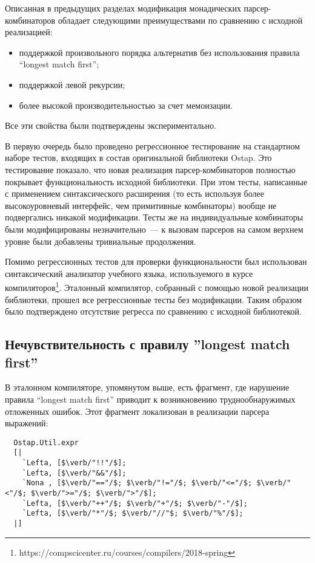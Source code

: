 \documentclass[conference]{IEEEtran}
\begin{document}
Описанная в предыдущих разделах модификация монадических парсер-комбинаторов обладает следующими преимуществами по сравнению с исходной реализацией:

\begin{itemize}
  \item поддержкой произвольного порядка альтернатив без использования правила ``longest match first'';
  \item поддержкой левой рекурсии;
  \item более высокой производительностью за счет мемоизации.
\end{itemize}

Все эти свойства были подтверждены экспериментально.

В первую очередь было проведено регрессионное тестирование на стандартном наборе тестов, входящих в состав оригинальной библиотеки Ostap. Это тестирование показало,
что новая реализация парсер-комбинаторов полностью покрывает функциональность исходной библиотеки. При этом тесты, написанные с применением синтаксического расширения (то есть
используя более высокоуровневый интерфейс, чем примитивные комбинаторы) вообще не подвергались никакой модификации. Тесты же на индивидуальные комбинаторы были модифицированы
незначительно~--- к вызовам парсеров на самом верхнем уровне были добавлены тривиальные продолжения.

Помимо регрессионных тестов для проверки функциональности был использован синтаксический анализатор учебного языка, используемого в курсе
компиляторов\footnote{https://compscicenter.ru/courses/compilers/2018-spring}. Эталонный компилятор, собранный с помощью новой реализации библиотеки, прошел все
регрессионные тесты без модификации. Таким образом было подтверждено отсутствие регресса по сравнению с исходной библиотекой.

\subsection{Нечувствительность с правилу ''longest match first''}

В эталонном компиляторе, упомянутом выше, есть фрагмент, где нарушение правила ``longest match first'' приводит к возникновению труднообнаружимых отложенных ошибок.
Этот фрагмент локализован в реализации парсера выражений:

\begin{lstlisting}
  Ostap.Util.expr
  [|                
    `Lefta, [$\verb/"!!"/$];
    `Lefta, [$\verb/"&&"/$];
    `Nona , [$\verb/"=="/$; $\verb/"!="/$; $\verb/"<="/$; $\verb/"<"/$; $\verb/">="/$; $\verb/">"/$];
    `Lefta, [$\verb/"++"/$; $\verb/"+"/$; $\verb/"-"/$];
    `Lefta, [$\verb/"*"/$; $\verb/"//"$; $\verb/"%"/$];
  |] 
\end{lstlisting}
\end{document}
